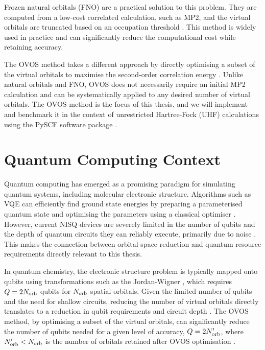 Frozen natural orbitals (FNO) are a practical solution to this problem. They are computed from a low-cost correlated calculation, such as MP2, and the virtual orbitals are truncated based on an occupation threshold \cite{Taube2005}. This method is widely used in practice and can significantly reduce the computational cost while retaining accuracy.

The OVOS method takes a different approach by directly optimising a subset of the virtual orbitals to maximise the second-order correlation energy \cite{Adamowicz1987}. Unlike natural orbitals and FNO, OVOS does not necessarily require an initial MP2 calculation and can be systematically applied to any desired number of virtual orbitals. The OVOS method is the focus of this thesis, and we will implement and benchmark it in the context of unrestricted Hartree-Fock (UHF) calculations using the PySCF software package \cite{Sun2020}.

\section{Quantum Computing Context}
\label{sec:int_quantum_context}

Quantum computing has emerged as a promising paradigm for simulating quantum systems, including molecular electronic structure. Algorithms such as VQE can efficiently find ground state energies by preparing a parameterised quantum state and optimising the parameters using a classical optimiser \cite{Peruzzo2014}. However, current NISQ devices are severely limited in the number of qubits and the depth of quantum circuits they can reliably execute, primarily due to noise \cite{Cao2019}. This makes the connection between orbital-space reduction and quantum resource requirements directly relevant to this thesis.

\newpage

In quantum chemistry, the electronic structure problem is typically mapped onto qubits using transformations such as the Jordan-Wigner \cite{Seeley2012}, which requires $Q = 2N_{\rm orb}$ qubits for $N_{\rm orb}$ spatial orbitals. Given the limited number of qubits and the need for shallow circuits, reducing the number of virtual orbitals directly translates to a reduction in qubit requirements and circuit depth \cite{Cao2019}. The OVOS method, by optimising a subset of the virtual orbitals, can significantly reduce the number of qubits needed for a given level of accuracy, $Q = 2N'_{\rm orb}$, where $N'_{\rm orb} < N_{\rm orb}$ is the number of orbitals retained after OVOS optimisation \cite{Adamowicz1987}.

